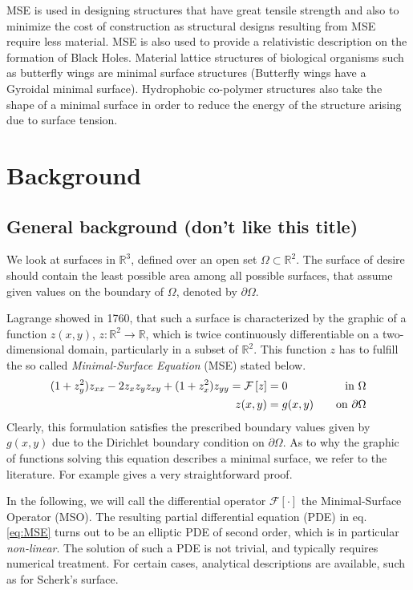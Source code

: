 \documentclass[11pt]{scrartcl}
\newcommand{\mSurf}[1]{\ensuremath{\mathcal{F}\left[#1\right]}}
\begin{document}
MSE is used in designing structures that have great tensile strength and also to minimize the cost of construction as structural designs resulting from MSE require less material. MSE is also used to provide a relativistic description on the formation of Black Holes. Material lattice structures of biological organisms such as butterfly wings are minimal surface structures (Butterfly wings have a Gyroidal minimal surface). Hydrophobic  co-polymer structures also take the shape of a minimal surface in order to reduce the energy of the structure arising due to surface tension. 
\section{Background}
\subsection{General background (don't like this title)}
We look at surfaces in $ \mathbb{R}^3 $, defined over an open set $\Omega \subset \mathbb{R}^2$. 
The surface of desire should contain the least possible area among all possible surfaces, that assume given values on the boundary of $\Omega$, denoted by $\partial \Omega$. \cite{Sakai1976}

Lagrange showed in 1760, that such a surface is characterized by the graphic of a function $z(x,y)$, $z: \mathbb{R}^2 \to \mathbb{R} $, which is twice continuously differentiable on a two-dimensional domain, particularly in a subset of $\mathbb{R}^2$.
This function $z$ has to fulfill the so called \textit{Minimal-Surface Equation} (MSE) stated below.
\begin{align}\label{eq:MSE}
	(1+z_y^2) z_{xx} - 2 z_x z_y z_{xy} + (1+z_x^2)z_{yy} = \mSurf{z} &= 0 \quad &\text{in } \Omega \\
	z(x,y) &= g(x,y) \quad &\text{on } \partial \Omega \notag
\end{align}
Clearly, this formulation satisfies the prescribed boundary values given by $g(x,y)$ due to the Dirichlet boundary condition on $\partial\Omega$.
As to why the graphic of functions solving this equation describes a minimal surface, we refer to the literature. For example \cite{Sakai1976} gives a very straightforward proof.

In the following, we will call the differential operator $\mSurf{\cdot}$ the Minimal-Surface Operator (MSO). The resulting partial differential equation (PDE) in eq. \eqref{eq:MSE} turns out to be an elliptic PDE of second order, which is in particular \textit{non-linear}. The solution of such a PDE is not trivial, and typically requires numerical treatment. For certain cases, analytical descriptions are available, such as for Scherk's surface.
\end{document}
